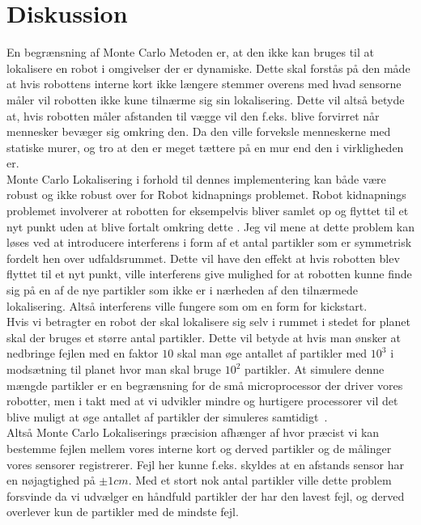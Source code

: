 \documentclass[../../SRP.tex]{subfiles}
\begin{document}
\chapter{Diskussion}

En begrænsning af Monte Carlo Metoden er, at den ikke kan bruges til at lokalisere en robot i omgivelser der er dynamiske. Dette skal forstås på den måde at hvis robottens interne kort ikke længere stemmer overens med hvad sensorne måler vil robotten ikke kune tilnærme sig sin lokalisering. Dette vil altså betyde at, hvis robotten måler afstanden til vægge vil den f.eks. blive forvirret når mennesker bevæger sig omkring den. Da den ville forveksle menneskerne med statiske murer, og tro at den er meget tættere på en mur end den i virkligheden er. \\

Monte Carlo Lokalisering i forhold til dennes implementering kan både være robust og ikke robust over for Robot kidnapnings problemet. Robot kidnapnings problemet involverer at robotten for eksempelvis bliver samlet op og flyttet til et nyt punkt uden at blive fortalt omkring dette \cite{ML}. Jeg vil mene at dette problem kan løses ved at introducere interferens i form af et antal partikler som er symmetrisk fordelt hen over udfaldsrummet. Dette vil have den effekt at hvis robotten blev flyttet til et nyt punkt, ville interferens give mulighed for at robotten kunne finde sig på en af de nye partikler som ikke er i nærheden af den tilnærmede lokalisering. Altså interferens ville fungere som om en form for kickstart. \\

Hvis vi betragter en robot der skal lokalisere sig selv i rummet i stedet for planet skal der bruges et større antal partikler. Dette vil betyde at hvis man ønsker at nedbringe fejlen med en faktor $10$ skal man øge antallet af partikler med $10^3$ i modsætning til planet hvor man skal bruge $10^2$ partikler. At simulere denne mængde partikler er en begrænsning for de små microprocessor der driver vores robotter, men i takt med at vi udvikler mindre og hurtigere processorer vil det blive muligt at øge antallet af partikler der simuleres samtidigt \cite{ML}. \\

Altså Monte Carlo Lokaliserings præcision afhænger af hvor præcist vi kan bestemme fejlen mellem vores interne kort og derved partikler og de målinger vores sensorer registrerer. Fejl her kunne f.eks. skyldes at en afstands sensor har en nøjagtighed på $\pm1cm$. Med et stort nok antal partikler ville dette problem forsvinde da vi udvælger en håndfuld partikler der har den lavest fejl, og derved overlever kun de partikler med de mindste fejl.
\end{document}
